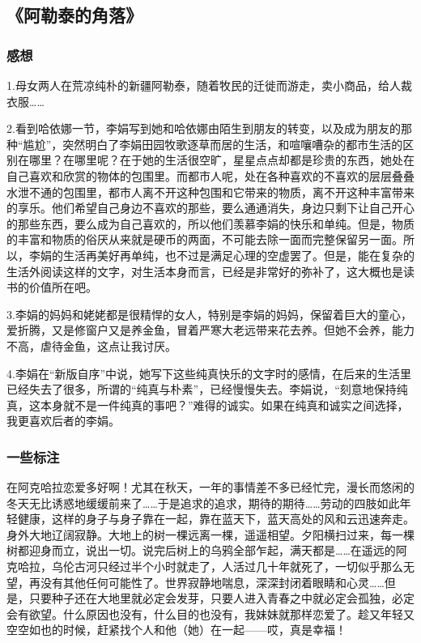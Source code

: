 \subsection{《阿勒泰的角落》}
\subsubsection{感想}

1.母女两人在荒凉纯朴的新疆阿勒泰，随着牧民的迁徙而游走，卖小商品，给人裁衣服……

2.看到哈依娜一节，李娟写到她和哈依娜由陌生到朋友的转变，以及成为朋友的那种“尴尬”，突然明白了李娟田园牧歌逐草而居的生活，和喧嚷嘈杂的都市生活的区别在哪里？在哪里呢？在于她的生活很空旷，星星点点却都是珍贵的东西，她处在自己喜欢和欣赏的物体的包围里。而都市人呢，处在各种喜欢的不喜欢的层层叠叠水泄不通的包围里，都市人离不开这种包围和它带来的物质，离不开这种丰富带来的享乐。他们希望自己身边不喜欢的那些，要么通通消失，身边只剩下让自己开心的那些东西，要么成为自己喜欢的，所以他们羡慕李娟的快乐和单纯。但是，物质的丰富和物质的俗厌从来就是硬币的两面，不可能去除一面而完整保留另一面。所以，李娟的生活再美好再单纯，也不过是满足心理的空虚罢了。但是，能在复杂的生活外阅读这样的文字，对生活本身而言，已经是非常好的弥补了，这大概也是读书的价值所在吧。

3.李娟的妈妈和姥姥都是很精悍的女人，特别是李娟的妈妈，保留着巨大的童心，爱折腾，又是修窗户又是养金鱼，冒着严寒大老远带来花去养。但她不会养，能力不高，虐待金鱼，这点让我讨厌。

4.李娟在“新版自序”中说，她写下这些纯真快乐的文字时的感情，在后来的生活里已经失去了很多，所谓的“纯真与朴素”，已经慢慢失去。李娟说，“刻意地保持纯真，这本身就不是一件纯真的事吧？”难得的诚实。如果在纯真和诚实之间选择，我更喜欢后者的李娟。

\subsubsection{一些标注}

在阿克哈拉恋爱多好啊！尤其在秋天，一年的事情差不多已经忙完，漫长而悠闲的冬天无比诱惑地缓缓前来了……于是追求的追求，期待的期待……劳动的四肢如此年轻健康，这样的身子与身子靠在一起，靠在蓝天下，蓝天高处的风和云迅速奔走。身外大地辽阔寂静。大地上的树一棵远离一棵，遥遥相望。夕阳横扫过来，每一棵树都迎身而立，说出一切。说完后树上的乌鸦全部乍起，满天都是……在遥远的阿克哈拉，乌伦古河只经过半个小时就走了，人活过几十年就死了，一切似乎那么无望，再没有其他任何可能性了。世界寂静地喘息，深深封闭着眼睛和心灵……但是，只要种子还在大地里就必定会发芽，只要人进入青春之中就必定会孤独，必定会有欲望。什么原因也没有，什么目的也没有，我妹妹就那样恋爱了。趁又年轻又空空如也的时候，赶紧找个人和他（她）在一起——哎，真是幸福！


